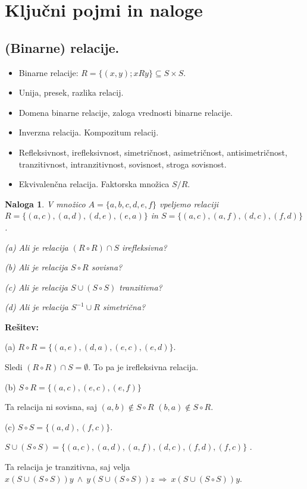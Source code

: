 \documentclass[11pt,paper=b5,DIV=13,headinclude,footinclude]{scrbook}
\def\inn {{~\wedge~}}
\def\sledi {{~\Rightarrow~}}
\newtheorem*{problem}{Naloga}
\begin{document}
\section{Ključni pojmi in naloge}


\subsection{(Binarne) relacije.}

\begin{itemize}
  \item Binarne relacije:
  $R = \{(x,y) ; xRy \}\subseteq S\times S$.
  \item Unija, presek, razlika relacij.
  \item Domena binarne relacije, zaloga vrednosti binarne relacije.
  \item Inverzna relacija. Kompozitum relacij.
\item Refleksivnost, irefleksivnost, simetričnost, asimetričnost, antisimetričnost, tranzitivnost, intranzitivnost,
sovisnost, stroga sovisnost.
\item Ekvivalenčna relacija. Faktorska množica $S/R$.
\end{itemize}

\begin{problem}
V množico $A = \{a, b, c, d, e, f \}$ vpeljemo relaciji
$R = \{(a, c), (a, d), (d, e), (e, a)\}$ in
$S = \{(a, c), (a, f), (d, c), (f, d)\}$ .

(a) Ali je relacija $(R\circ R)\cap S$ irefleksivna?

(b) Ali je relacija $S\circ R$ sovisna?

(c) Ali je relacija $S\cup (S\circ S)$ tranzitivna?

(d) Ali je relacija $S^{-1}\cup R$ simetrična?
\end{problem}

\textbf{Rešitev:}

(a)
$R\circ R = \{(a,e), (d,a), (e,c), (e,d)\}$.

Sledi
$(R\circ R)\cap S = \emptyset$. To pa je irefleksivna relacija.

(b) $S\circ R = \{(a,c), (e,c), (e,f)\}$

Ta relacija ni sovisna, saj $(a,b)\not\in S\circ R$
$(b,a)\not\in S\circ R$.

(c)
$S\circ S = \{(a,d), (f,c)\}$.

$S\cup (S\circ S)= \{(a, c), (a,d), (a, f), (d, c), (f, d), (f,c)\}$ .

Ta relacija je tranzitivna, saj velja $x(S\cup (S\circ S))y\inn
y(S\cup (S\circ S))z\sledi x(S\cup (S\circ S))y$.
\end{document}
